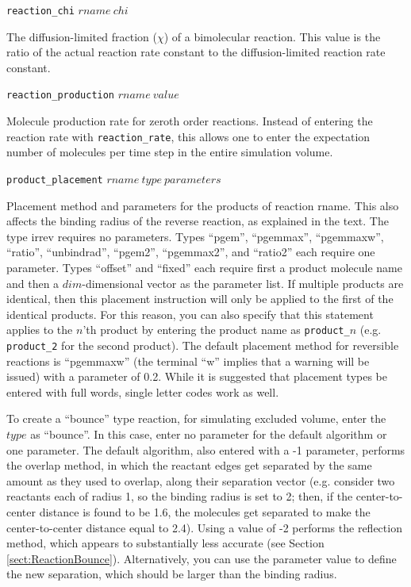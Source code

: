 \documentclass {scrbook}
\newcommand {\ttt} {\texttt}
\begin{document}
\begin{description}
\item{\ttt{reaction\_chi} $rname\ chi$}

The diffusion-limited fraction ($\chi$) of a bimolecular reaction. This value is the ratio of the actual reaction rate constant to the diffusion-limited reaction rate constant.

\item{\ttt{reaction\_production} $rname\ value$}

Molecule production rate for zeroth order reactions. Instead of entering the reaction rate with \ttt{reaction\_rate}, this allows one to enter the expectation number of molecules per time step in the entire simulation volume.

\item{\ttt{product\_placement} $rname\ type\ parameters$}

Placement method and parameters for the products of reaction rname. This also affects the binding radius of the reverse reaction, as explained in the text. The type irrev requires no parameters. Types ``pgem'', ``pgemmax'', ``pgemmaxw'', ``ratio'', ``unbindrad'', ``pgem2'', ``pgemmax2'', and ``ratio2'' each require one parameter. Types ``offset'' and ``fixed'' each require first a product molecule name and then a $dim$-dimensional vector as the parameter list. If multiple products are identical, then this placement instruction will only be applied to the first of the identical products. For this reason, you can also specify that this statement applies to the $n$'th product by entering the product name as \ttt{product\_}$n$ (e.g. \ttt{product\_2} for the second product). The default placement method for reversible reactions is ``pgemmaxw'' (the terminal ``w'' implies that a warning will be issued) with a parameter of 0.2. While it is suggested that placement types be entered with full words, single letter codes work as well.

To create a ``bounce'' type reaction, for simulating excluded volume, enter the $type$ as ``bounce''. In this case, enter no parameter for the default algorithm or one parameter. The default algorithm, also entered with a -1 parameter, performs the overlap method, in which the reactant edges get separated by the same amount as they used to overlap, along their separation vector (e.g. consider two reactants each of radius 1, so the binding radius is set to 2; then, if the center-to-center distance is found to be 1.6, the molecules get separated to make the center-to-center distance equal to 2.4). Using a value of -2 performs the reflection method, which appears to substantially less accurate (see Section \ref{sect:ReactionBounce}). Alternatively, you can use the parameter value to define the new separation, which should be larger than the binding radius.


\end{description}
\end{document}
